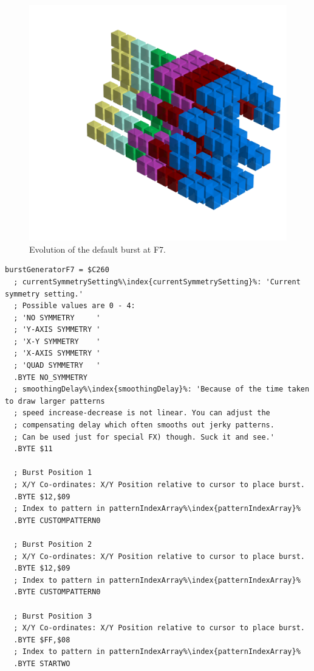 \clearpage
{}
\begin{figure}[H]
    \centering
    \begin{adjustbox}{width=12cm,center}
      \includegraphics[width=12cm]{src/patterns/bursts/pattern3-45.png}%
    \end{adjustbox}
\caption{Evolution of the default burst at F7.}
\end{figure}
\clearpage

\begin{lstlisting}[caption=Source code for the F7 Burst.,escapechar=\%]
burstGeneratorF7 = $C260
  ; currentSymmetrySetting%\index{currentSymmetrySetting}%: 'Current symmetry setting.'
  ; Possible values are 0 - 4:
  ; 'NO SYMMETRY     '
  ; 'Y-AXIS SYMMETRY '
  ; 'X-Y SYMMETRY    '
  ; 'X-AXIS SYMMETRY '
  ; 'QUAD SYMMETRY   '
  .BYTE NO_SYMMETRY
  ; smoothingDelay%\index{smoothingDelay}%: 'Because of the time taken to draw larger patterns
  ; speed increase-decrease is not linear. You can adjust the 
  ; compensating delay which often smooths out jerky patterns. 
  ; Can be used just for special FX) though. Suck it and see.'
  .BYTE $11

  ; Burst Position 1
  ; X/Y Co-ordinates: X/Y Position relative to cursor to place burst.
  .BYTE $12,$09
  ; Index to pattern in patternIndexArray%\index{patternIndexArray}%
  .BYTE CUSTOMPATTERN0

  ; Burst Position 2
  ; X/Y Co-ordinates: X/Y Position relative to cursor to place burst.
  .BYTE $12,$09
  ; Index to pattern in patternIndexArray%\index{patternIndexArray}%
  .BYTE CUSTOMPATTERN0

  ; Burst Position 3
  ; X/Y Co-ordinates: X/Y Position relative to cursor to place burst.
  .BYTE $FF,$08
  ; Index to pattern in patternIndexArray%\index{patternIndexArray}%
  .BYTE STARTWO

\end{lstlisting}

\clearpage
